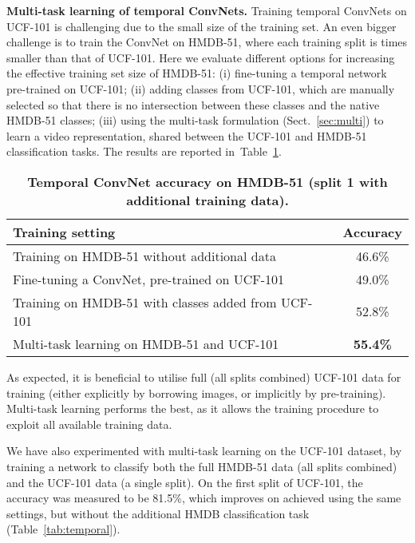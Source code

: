 \documentclass{article} \usepackage{nips14submit_e,times}
\newcommand{\tblref}[1]{Table~\ref{#1}}
\newcommand{\sref}[1]{Sect.~\ref{#1}}
\begin{document}
\noindent\textbf{Multi-task learning of temporal ConvNets.}
Training temporal ConvNets on UCF-101 is challenging due to the small size of the training set. An even bigger challenge is to train the ConvNet on HMDB-51, where
each training split is  times smaller than that of UCF-101. Here we evaluate different options for increasing the effective training set size of HMDB-51:
(i) fine-tuning a temporal network pre-trained on UCF-101; 
(ii) adding  classes from UCF-101, which are manually selected so that there is no intersection between
these classes and the native HMDB-51 classes; 
(iii) using the multi-task formulation (\sref{sec:multi}) to learn a video representation, shared between the UCF-101 and HMDB-51 classification
tasks. The results are reported in~\tblref{tab:hmdb_extra_data}. 
\begin{table}[ht]
\small
\centering
\caption{\textbf{Temporal ConvNet accuracy on HMDB-51 (split 1 with additional training data).}
}
\begin{tabular}{|l|c|} \hline
\multicolumn{1}{|l|}{Training setting} & Accuracy \\ \hline
Training on HMDB-51 without additional data & 46.6\%  \\ \hline
Fine-tuning a ConvNet, pre-trained on UCF-101 & 49.0\%  \\ \hline
Training on HMDB-51 with classes added from UCF-101 & 52.8\% \\ \hline
Multi-task learning on HMDB-51 and UCF-101 & \textbf{55.4\%} \\ \hline
\end{tabular}
\label{tab:hmdb_extra_data}
\end{table}
As expected, it is beneficial to utilise full (all splits combined) UCF-101 data for training (either explicitly by borrowing images, or implicitly by pre-training). 
Multi-task learning performs the best, as it allows the training procedure to exploit all available training data.

We have also experimented with multi-task learning on the UCF-101 dataset, by training a network to classify both the full HMDB-51 data (all splits combined) and
the UCF-101 data (a single split). On the first split of UCF-101, the accuracy was measured to be 81.5\%,
which improves on  achieved using the same settings, but without the additional HMDB classification task (\tblref{tab:temporal}).
\end{document}
